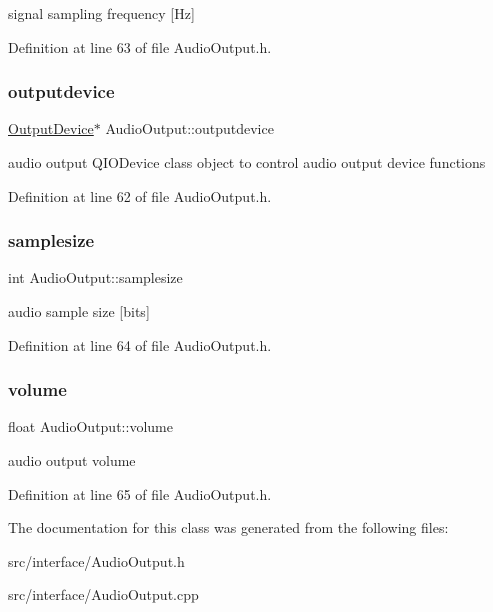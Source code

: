 signal sampling frequency \mbox{[}Hz\mbox{]} 

Definition at line 63 of file Audio\+Output.\+h.

\mbox{\label{class_audio_output_aa3e000199604f972e59242fb15a6707e}} 
\subsubsection{\texorpdfstring{outputdevice}{outputdevice}}
{\footnotesize\ttfamily \hyperlink{class_output_device}{Output\+Device}$\ast$ Audio\+Output\+::outputdevice}

audio output Q\+I\+O\+Device class object to control audio output device functions 

Definition at line 62 of file Audio\+Output.\+h.

\mbox{\label{class_audio_output_aac9c297a839bb25c1232fc5adcce6cab}} 
\subsubsection{\texorpdfstring{samplesize}{samplesize}}
{\footnotesize\ttfamily int Audio\+Output\+::samplesize}

audio sample size \mbox{[}bits\mbox{]} 

Definition at line 64 of file Audio\+Output.\+h.

\mbox{\label{class_audio_output_a16937c9086904959b06b77326032aa72}} 
\subsubsection{\texorpdfstring{volume}{volume}}
{\footnotesize\ttfamily float Audio\+Output\+::volume}

audio output volume 

Definition at line 65 of file Audio\+Output.\+h.



The documentation for this class was generated from the following files\+:\begin{DoxyCompactItemize}
\item 
src/interface/Audio\+Output.\+h\item 
src/interface/Audio\+Output.\+cpp\end{DoxyCompactItemize}
